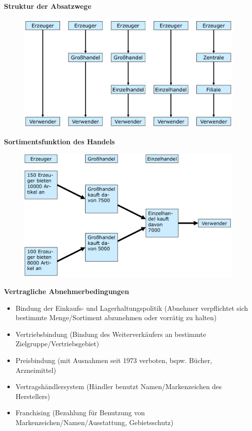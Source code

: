 \documentclass[a4paper,11pt, twoside]{article}
\begin{document}
\newpage
\textbf{Struktur der Absatzwege}
\begin{figure}[h]
 \begin{center}
   \includegraphics[scale=0.3]{bilder/absatzwege.png}
 \end{center}
\end{figure}

\textbf{Sortimentsfunktion des Handels}
\begin{figure}[h]
 \begin{center}
   \includegraphics[scale=0.3]{bilder/sortimentsfunktion.png}
 \end{center}
\end{figure}
\newpage

\textbf{Vertragliche Abnehmerbedingungen}
\begin{itemize}
	\item Bindung der Einkaufs- und Lagerhaltungspolitik (Abnehmer verpflichtet sich bestimmte Menge/Sortiment abzunehmen oder vorrätig zu halten) 
	\item Vertriebsbindung (Bindung des Weiterverkäufers an bestimmte Zielgruppe/Vertriebsgebiet) 
	\item Preisbindung (mit Ausnahmen seit 1973 verboten, bspw. Bücher, Arzneimittel)
	\item Vertragshändlersystem (Händler benutzt Namen/Markenzeichen des Herstellers)
	\item Franchising (Bezahlung für Benutzung von Markenzeichen/Namen/Ausstattung, Gebietsschutz)
\end{itemize}
\end{document}
